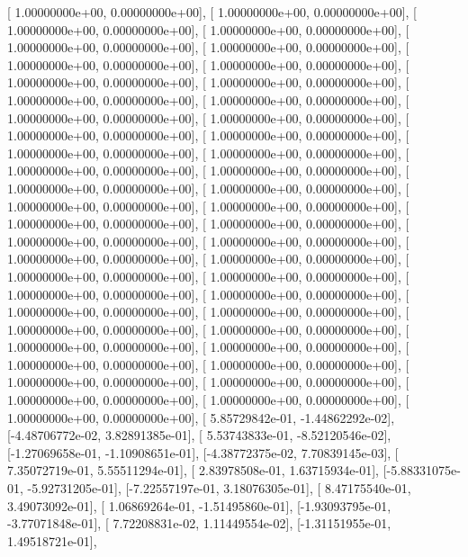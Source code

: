 \documentclass{article}
\begin{document}
       [ 1.00000000e+00,  0.00000000e+00],
       [ 1.00000000e+00,  0.00000000e+00],
       [ 1.00000000e+00,  0.00000000e+00],
       [ 1.00000000e+00,  0.00000000e+00],
       [ 1.00000000e+00,  0.00000000e+00],
       [ 1.00000000e+00,  0.00000000e+00],
       [ 1.00000000e+00,  0.00000000e+00],
       [ 1.00000000e+00,  0.00000000e+00],
       [ 1.00000000e+00,  0.00000000e+00],
       [ 1.00000000e+00,  0.00000000e+00],
       [ 1.00000000e+00,  0.00000000e+00],
       [ 1.00000000e+00,  0.00000000e+00],
       [ 1.00000000e+00,  0.00000000e+00],
       [ 1.00000000e+00,  0.00000000e+00],
       [ 1.00000000e+00,  0.00000000e+00],
       [ 1.00000000e+00,  0.00000000e+00],
       [ 1.00000000e+00,  0.00000000e+00],
       [ 1.00000000e+00,  0.00000000e+00],
       [ 1.00000000e+00,  0.00000000e+00],
       [ 1.00000000e+00,  0.00000000e+00],
       [ 1.00000000e+00,  0.00000000e+00],
       [ 1.00000000e+00,  0.00000000e+00],
       [ 1.00000000e+00,  0.00000000e+00],
       [ 1.00000000e+00,  0.00000000e+00],
       [ 1.00000000e+00,  0.00000000e+00],
       [ 1.00000000e+00,  0.00000000e+00],
       [ 1.00000000e+00,  0.00000000e+00],
       [ 1.00000000e+00,  0.00000000e+00],
       [ 1.00000000e+00,  0.00000000e+00],
       [ 1.00000000e+00,  0.00000000e+00],
       [ 1.00000000e+00,  0.00000000e+00],
       [ 1.00000000e+00,  0.00000000e+00],
       [ 1.00000000e+00,  0.00000000e+00],
       [ 1.00000000e+00,  0.00000000e+00],
       [ 1.00000000e+00,  0.00000000e+00],
       [ 1.00000000e+00,  0.00000000e+00],
       [ 1.00000000e+00,  0.00000000e+00],
       [ 1.00000000e+00,  0.00000000e+00],
       [ 1.00000000e+00,  0.00000000e+00],
       [ 1.00000000e+00,  0.00000000e+00],
       [ 1.00000000e+00,  0.00000000e+00],
       [ 1.00000000e+00,  0.00000000e+00],
       [ 1.00000000e+00,  0.00000000e+00],
       [ 1.00000000e+00,  0.00000000e+00],
       [ 1.00000000e+00,  0.00000000e+00],
       [ 1.00000000e+00,  0.00000000e+00],
       [ 1.00000000e+00,  0.00000000e+00],
       [ 5.85729842e-01, -1.44862292e-02],
       [-4.48706772e-02,  3.82891385e-01],
       [ 5.53743833e-01, -8.52120546e-02],
       [-1.27069658e-01, -1.10908651e-01],
       [-4.38772375e-02,  7.70839145e-03],
       [ 7.35072719e-01,  5.55511294e-01],
       [ 2.83978508e-01,  1.63715934e-01],
       [-5.88331075e-01, -5.92731205e-01],
       [-7.22557197e-01,  3.18076305e-01],
       [ 8.47175540e-01,  3.49073092e-01],
       [ 1.06869264e-01, -1.51495860e-01],
       [-1.93093795e-01, -3.77071848e-01],
       [ 7.72208831e-02,  1.11449554e-02],
       [-1.31151955e-01,  1.49518721e-01],
\end{document}
